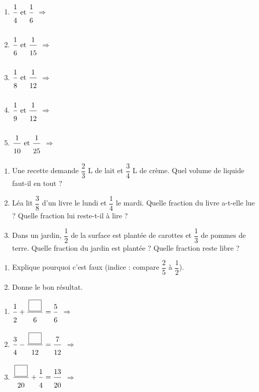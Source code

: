 \bigskip
{}
 
\begin{enumerate}[leftmargin=*,align=parleft, label=\alph*), itemsep=9pt]
\item $\FA{1}{4}\text{ et }\FA{1}{6}$ \quad $\Longrightarrow$
\item $\FA{1}{6}\text{ et }\FA{1}{15}$ \quad $\Longrightarrow$
\item $\FA{1}{8}\text{ et }\FA{1}{12}$ \quad $\Longrightarrow$
\item $\FA{1}{9}\text{ et }\FA{1}{12}$ \quad $\Longrightarrow$
\item $\FA{1}{10}\text{ et }\FA{1}{25}$ \quad $\Longrightarrow$
\end{enumerate}
 
\bigskip
{}
 
\begin{enumerate}[leftmargin=*,align=parleft, label=\alph*), itemsep=9pt]
\item Une recette demande $\dfrac{2}{3}$ L de lait et $\dfrac{3}{4}$ L de crème. Quel volume de liquide faut-il en tout ?
\item Léa lit $\dfrac{3}{8}$ d'un livre le lundi et $\dfrac{1}{4}$ le mardi. Quelle fraction du livre a-t-elle lue ? Quelle fraction lui reste-t-il à lire ?
\item Dans un jardin, $\dfrac{1}{2}$ de la surface est plantée de carottes et $\dfrac{1}{3}$ de pommes de terre. Quelle fraction du jardin est plantée ? Quelle fraction reste libre ?
\end{enumerate}
 
\bigskip
{}
 
\begin{enumerate}[leftmargin=*,align=parleft, label=\alph*), itemsep=9pt]
\item Explique pourquoi c'est faux (indice : compare $\dfrac{2}{5}$ à $\dfrac{1}{2}$).
\item Donne le bon résultat.
\end{enumerate}
 
\bigskip
{}
 
\begin{enumerate}[leftmargin=*,align=parleft, label=\alph*), itemsep=9pt]
\item $\FA{1}{2}+\FA{\CaseC}{6}=\FA{5}{6}$ \quad $\Longrightarrow$
\item $\FA{3}{4}-\FA{\CaseC}{12}=\FA{7}{12}$ \quad $\Longrightarrow$
\item $\FA{\CaseC}{20}+\FA{1}{4}=\FA{13}{20}$ \quad $\Longrightarrow$
\end{enumerate}
 

